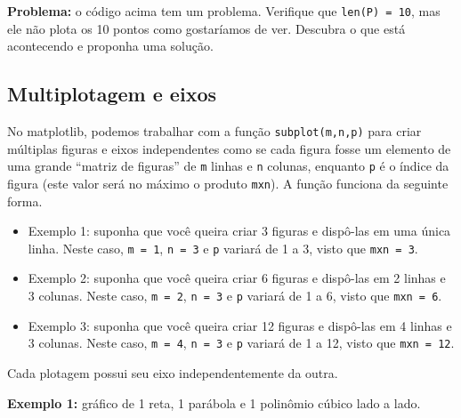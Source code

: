 \documentclass[11pt]{article}
\begin{document}
    \textbf{Problema:} o código acima tem um problema. Verifique que
\texttt{len(P)\ =\ 10}, mas ele não plota os 10 pontos como gostaríamos
de ver. Descubra o que está acontecendo e proponha uma solução.

    \hypertarget{multiplotagem-e-eixos}{%
\subsection{Multiplotagem e eixos}\label{multiplotagem-e-eixos}}

No matplotlib, podemos trabalhar com a função \texttt{subplot(m,n,p)}
para criar múltiplas figuras e eixos independentes como se cada figura
fosse um elemento de uma grande ``matriz de figuras'' de \texttt{m}
linhas e \texttt{n} colunas, enquanto \texttt{p} é o índice da figura
(este valor será no máximo o produto \texttt{mxn}). A função funciona da
seguinte forma.

\begin{itemize}
\item
  Exemplo 1: suponha que você queira criar 3 figuras e dispô-las em uma
  única linha. Neste caso, \texttt{m\ =\ 1}, \texttt{n\ =\ 3} e
  \texttt{p} variará de 1 a 3, visto que \texttt{mxn\ =\ 3}.
\item
  Exemplo 2: suponha que você queira criar 6 figuras e dispô-las em 2
  linhas e 3 colunas. Neste caso, \texttt{m\ =\ 2}, \texttt{n\ =\ 3} e
  \texttt{p} variará de 1 a 6, visto que \texttt{mxn\ =\ 6}.
\item
  Exemplo 3: suponha que você queira criar 12 figuras e dispô-las em 4
  linhas e 3 colunas. Neste caso, \texttt{m\ =\ 4}, \texttt{n\ =\ 3} e
  \texttt{p} variará de 1 a 12, visto que \texttt{mxn\ =\ 12}.
\end{itemize}

Cada plotagem possui seu eixo independentemente da outra.

    \textbf{Exemplo 1:} gráfico de 1 reta, 1 parábola e 1 polinômio cúbico
lado a lado.
\end{document}
